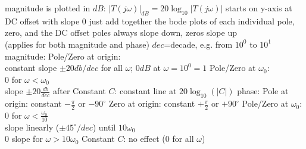 \documentclass[12pt]{article}
\begin{document}
\begin{spacing}{0.8}
\begin{multicols*}{2}
\begin{flushleft}
\begin{outline}[longenum]
  \1 magnitude is plotted in $dB$: $|T(j\omega)|_{dB}=20\log_{10}|T(j\omega)|$
  \1 starts on y-axis at DC offset with slope 0
  \1 just add together the bode plots of each individual pole, zero, and the DC offset
  \1 poles always slope down, zeros slope up
    \\ (applies for both magnitude and phase)
  \1 $dec$=decade, e.g. from $10^0$ to $10^1$
  \1 magnitude:
    \2 Pole/Zero at origin: 
      \\ constant slope $\pm20db/dec$ for all $\omega$; $0dB$ at $\omega=10^0=1$
    \2 Pole/Zero at $\omega_0$:
      \\ 0 for $\omega<\omega_0$
      \\ slope $\pm20\frac{db}{dec}$ after
    \2 Constant $C$: constant line at $20\log_{10}(|C|)$
  \1 phase:
    \2 Pole at origin: constant $-\frac{\pi}{2}$ or $-90^\circ$
    \2 Zero at origin: constant $+\frac{\pi}{2}$ or $+90^\circ$
    \2 Pole/Zero at $\omega_0$:
      \\ $0$ for $\omega<\frac{\omega_0}{10}$
      \\ slope linearly ($\pm45^\circ/dec$) until $10\omega_0$
      \\ $0$ slope for $\omega>10\omega_0$
    \2 Constant $C$: no effect ($0$ for all $\omega$)



\end{outline}
\end{flushleft}
\end{multicols*}
\end{spacing}
\end{document}
